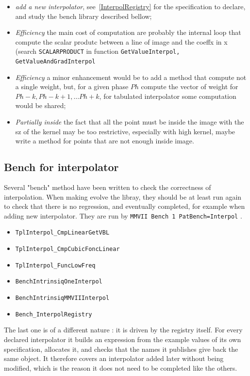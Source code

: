 \begin{itemize}
    \item \emph{add a new interpolator}, see~\ref{InterpolRegistry} for the specification to
	    declare, and study the bench library described bellow;
    \item \emph{Efficiency} the main cost of computation are probably the internal loop  that compute
	    the  scalar produtc between a line of  image and the coeffx in x (search {\tt SCALARPRODUCT}
		in function {\tt GetValueInterpol, GetValueAndGradInterpol}

    \item \emph{Efficiency} a minor enhancement would be to add a method that compute not a single
	   weight, but, for a given phase $Ph$ compute the vector of weight for $Ph-k,Ph-k+1,\dots Ph+k$,
           for tabulated interpolator some computation would be shared;

   \item \emph{Partially inside} the fact that all the point must be inside the image with the sz of the kernel
	   may be too restrictive, especially with high kernel, maybe write a method for points that are not
		enough inside image.
\end{itemize}


\subsection{Bench for interpolator}
\label{InterpolBench}

Several "bench" method have been written to check the correctness of interpolation. When making evolve the
libray, they should be at least run again to check that there is no regression, and eventually completed,
for example when adding new interpolator.  They are run by {\tt MMVII Bench 1 PatBench=Interpol} .

\begin{itemize}
     \item {\tt TplInterpol\_CmpLinearGetVBL}
     \item {\tt TplInterpol\_CmpCubicFoncLinear}
     \item {\tt TplInterpol\_FuncLowFreq}
     \item {\tt BenchIntrinsiqOneInterpol}
     \item {\tt BenchIntrinsiqMMVIIInterpol}
     \item {\tt Bench\_InterpolRegistry}
\end{itemize}

The last one is of a different nature : it is driven by the registry itself.  For every declared
interpolator it builds an expression from the example values of its own specification, allocates
it, and checks that the names it publishes give back the same object.  It therefore covers an
interpolator added later without being modified, which is the reason it does not need to be
completed like the others.






